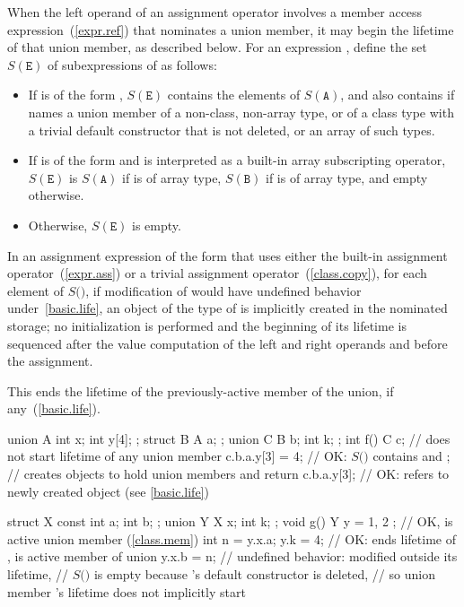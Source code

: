 \pnum
When the left operand of an assignment operator
involves a member access expression~(\ref{expr.ref})
that nominates a union member,
it may begin the lifetime of that union member,
as described below.
For an expression ,
define the set $S(\mathtt{E})$
of subexpressions of 
as follows:
\begin{itemize}
\item
If  is of the form ,
$S(\mathtt{E})$ contains the elements of $S(\mathtt{A})$,
and also contains 
if  names a union member of a non-class, non-array type,
or of a class type with a trivial default constructor that is not deleted,
or an array of such types.
\item
If  is of the form 
and is interpreted as a built-in array subscripting operator,
$S(\mathtt{E})$ is $S(\mathtt{A})$ if  is of array type,
$S(\mathtt{B})$ if  is of array type,
and empty otherwise.
\item
Otherwise, $S(\mathtt{E})$ is empty.
\end{itemize}
In an assignment expression of the form 
that uses either the built-in assignment operator~(\ref{expr.ass})
or a trivial assignment operator~(\ref{class.copy}),
for each element  of $S($$)$,
if modification of  would have undefined behavior under~\ref{basic.life},
an object of the type of  is implicitly created
in the nominated storage;
no initialization is performed and
the beginning of its lifetime is sequenced after
the value computation of the left and right operands
and before the assignment.
\begin{note}
This ends the lifetime of the previously-active
member of the union, if any~(\ref{basic.life}).
\end{note}
\begin{example}
\begin{codeblock}
union A { int x; int y[4]; };
struct B { A a; };
union C { B b; int k; };
int f() {
  C c;               // does not start lifetime of any union member
  c.b.a.y[3] = 4;    // OK: $S($$)$ contains  and ;
                     // creates objects to hold union members  and 
  return c.b.a.y[3]; // OK:  refers to newly created object (see \ref{basic.life})
}

struct X { const int a; int b; };
union Y { X x; int k; };
void g() {
  Y y = { { 1, 2 } }; // OK,  is active union member (\ref{class.mem})
  int n = y.x.a;
  y.k = 4;   // OK: ends lifetime of ,  is active member of union
  y.x.b = n; // undefined behavior:  modified outside its lifetime,
             // $S($$)$ is empty because 's default constructor is deleted,
             // so union member 's lifetime does not implicitly start
}
\end{codeblock}
\end{example}

